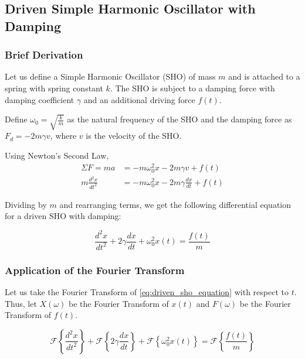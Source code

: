 \subsection{Driven Simple Harmonic Oscillator with Damping}

\subsubsection{Brief Derivation}
Let us define a Simple Harmonic Oscillator (SHO) of mass \(m\) and is attached to a spring with spring constant \(k\).
The SHO is subject to a damping force with damping coefficient \(\gamma\) and an additional driving force \(f(t)\).

\vspace{5mm}

Define \(\omega_0 = \sqrt{\frac{k}{m}}\) as the natural frequency of the SHO and the damping force as \(F_d = -2 m \gamma v\), where \(v\) is the velocity of the SHO.

\noindent
Using Newton's Second Law,
\begin{align}
    \Sigma F = ma &= -m \omega_0^2 x - 2 m \gamma v + f(t) \\
    m \frac{d^2 x}{dt^2} &= -m \omega_0^2 x - 2 m \gamma \frac{dx}{dt} + f(t)
\end{align}

\noindent
Dividing by \(m\) and rearranging terms, we get the following differential equation for a driven SHO with damping:

\begin{equation} \label{eq:driven_sho_equation}
    \frac{d^2 x}{dt^2} + 2 \gamma \frac{dx}{dt} + \omega_0^2 x(t) = \frac{f(t)}{m}
\end{equation}

\subsubsection{Application of the Fourier Transform}
\noindent
Let us take the Fourier Transform of \cref{eq:driven_sho_equation} with respect to \(t\). Thus, let \(X(\omega)\) be the Fourier Transform of \(x(t)\) and \(F(\omega)\) be the Fourier Transform of \(f(t)\).

\begin{equation} 
    \mathcal{F} \left\{ \frac{d^2 x}{dt^2} \right\} + \mathcal{F} \left\{ 2 \gamma \frac{dx}{dt} \right\} + \mathcal{F} \left\{ \omega_0^2 x(t) \right\} = \mathcal{F} \left\{ \frac{f(t)}{m} \right\}
\end{equation}

